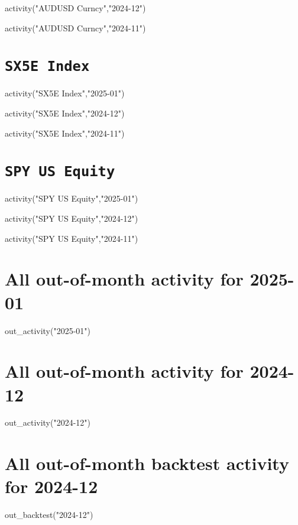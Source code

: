 \documentclass{article}
\begin{document}
\begin{pycode}
activity("AUDUSD Curncy","2024-12")
\end{pycode}

\begin{pycode}
activity("AUDUSD Curncy","2024-11")
\end{pycode}

\newpage
\section{\texttt{SX5E Index}}

\begin{pycode}
activity("SX5E Index","2025-01")
\end{pycode}

\begin{pycode}
activity("SX5E Index","2024-12")
\end{pycode}

\begin{pycode}
activity("SX5E Index","2024-11")
\end{pycode}

\newpage
\section{\texttt{SPY US Equity}}

\begin{pycode}
activity("SPY US Equity","2025-01")
\end{pycode}

\begin{pycode}
activity("SPY US Equity","2024-12")
\end{pycode}

\begin{pycode}
activity("SPY US Equity","2024-11")
\end{pycode}

\newpage
\section{All out-of-month activity for 2025-01}

\begin{pycode}
out_activity("2025-01")
\end{pycode}

\newpage
\section{All out-of-month activity for 2024-12}

\begin{pycode}
out_activity("2024-12")
\end{pycode}

\newpage
\section{All out-of-month backtest activity for 2024-12}

\begin{pycode}
out_backtest("2024-12")
\end{pycode}
\end{document}
